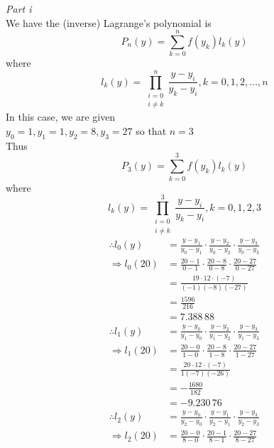 \documentclass[12pt,class=book,crop=false]{standalone}
\begin{document}
\begin{soln}
    \emph{Part i}\\
    We have the (inverse) Lagrange's polynomial is
    \[
        P_n(y)=\sum_{k=0}^nf(y_k)l_k(y)
    \]
    where
    \[
        l_k(y)=\prod_{\substack{i=0\\ i\neq k}}^n\frac{y-y_i}{y_k-y_i}, k=0,1,2,\dots,n
    \]
    In this case, we are given\\
    \indent \(  y_0=1,y_1=1,y_2=8,y_3=27 \) so that \(  n=3 \)\\
    Thus
    \[
        P_3(y)=\sum_{k=0}^3f(y_k)l_k(y)
    \]
    where
    \[
        l_k(y)=\prod_{\substack{i=0\\ i\neq k}}^3\frac{y-y_i}{y_k-y_i}, k=0,1,2,3
    \]
    \begin{align*}
        \therefore l_0(y)   & = \frac{y-y_1}{y_0-y_1}\cdot\frac{y-y_2}{y_0-y_2}\cdot\frac{y-y_3}{y_0-y_3} \\
        \Rightarrow l_0(20) & = \frac{20-1}{0-1}\cdot\frac{20-8}{0-8}\cdot\frac{20-27}{0-27}              \\
                            & = \frac{19\cdot12\cdot(-7)}{(-1)(-8)(-27)}                                  \\
                            & =\frac{1596}{216}                                                           \\
                            & =7.388\,88
    \end{align*}
    \begin{align*}
        \therefore l_1(y)   & = \frac{y-y_0}{y_1-y_0}\cdot\frac{y-y_2}{y_1-y_2}\cdot\frac{y-y_3}{y_1-y_3} \\
        \Rightarrow l_1(20) & = \frac{20-0}{1-0}\cdot\frac{20-8}{1-8}\cdot\frac{20-27}{1-27}              \\
                            & = \frac{20\cdot 12\cdot(-7)}{1(-7)(-26)}                                    \\
                            & =-\frac{1680}{182}                                                          \\
                            & =-9.230\,76
    \end{align*}
    \begin{align*}
        \therefore l_2(y)   & = \frac{y-y_0}{y_2-y_0}\cdot\frac{y-y_1}{y_2-y_1}\cdot\frac{y-y_3}{y_2-y_3} \\
        \Rightarrow l_2(20) & = \frac{20-0}{8-0}\cdot\frac{20-1}{8-1}\cdot\frac{20-27}{8-27}              \\

\end{align*}
\end{soln}
\end{document}
